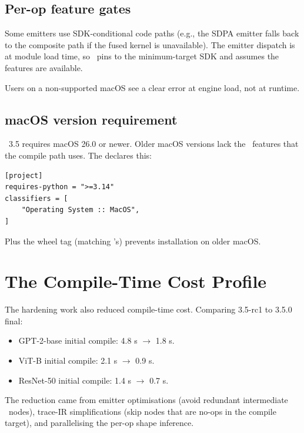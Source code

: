 \subsection{Per-op feature gates}
\label{ssec:compile_hardening:feature_gates}

Some emitters use SDK-conditional code paths (e.g., the SDPA
emitter falls back to the composite path if the fused kernel is
unavailable). The emitter dispatch is at module load time, so
\Lucid\ pins to the minimum-target SDK and assumes the features
are available.

Users on a non-supported macOS see a clear error at engine
load, not at runtime.

\subsection{macOS version requirement}
\label{ssec:compile_hardening:macos_req}

\Lucid\ 3.5 requires macOS 26.0 or newer. Older macOS versions
lack the \MPSGraph\ features that the compile path uses. The
 declares this:

\begin{lstlisting}[style=lucid,language=LucidPython]
[project]
requires-python = ">=3.14"
classifiers = [
    "Operating System :: MacOS",
]
\end{lstlisting}

Plus the wheel tag  (matching
\MLX's) prevents installation on older macOS.

\section{The Compile-Time Cost Profile}
\label{sec:compile_hardening:compile_cost}

The hardening work also reduced compile-time cost. Comparing
3.5-rc1 to 3.5.0 final:

\begin{itemize}
  \item GPT-2-base initial compile: 4.8 s $\to$ 1.8 s.
  \item ViT-B initial compile: 2.1 s $\to$ 0.9 s.
  \item ResNet-50 initial compile: 1.4 s $\to$ 0.7 s.
\end{itemize}

The reduction came from emitter optimisations (avoid redundant
intermediate \MPSGraph\ nodes), trace-IR simplifications (skip
nodes that are no-ops in the compile target), and parallelising
the per-op shape inference.

